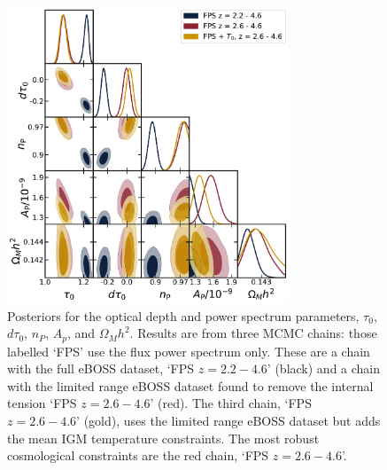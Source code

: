 \begin{figure}
    \centering
    \includegraphics[width=0.75\textwidth]{figures/cosmo_corner.pdf}
    \caption{\label{fig:cosmo_corner}
    Posteriors for the optical depth and power spectrum parameters, $\tau_0$, $d\tau_0$, $n_P$, $A_p$, and $\Omega_M h^2$.
    Results are from three MCMC chains: those labelled `FPS' use the flux power spectrum only. These are a chain with the full eBOSS dataset, `FPS $z=2.2 - 4.6$' (black) and a chain with the limited range eBOSS dataset found to remove the internal tension `FPS $z=2.6 - 4.6$' (red). The third chain, `FPS $z=2.6 - 4.6$' (gold), uses the limited range eBOSS dataset but adds the mean IGM temperature constraints. The most robust cosmological constraints are the red chain, `FPS $z=2.6 - 4.6$'.
    }
\end{figure}

